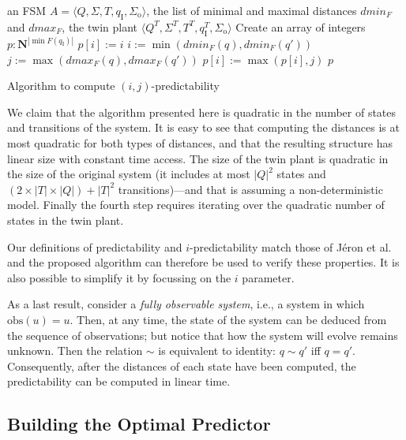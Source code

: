 \documentclass{article}
\newcommand{\naturals}{\mathbf{N}}
\newcommand{\qi}[0]{q_{\mathrm{I}}}
\newcommand{\sigmao}[0]{\Sigma_{\mathrm{o}}}
\newcommand{\obs}[0]{\mathrm{obs}}
\newcommand{\dmin}[1]{\mathit{dmin}_{#1}}
\newcommand{\dmax}[1]{\mathit{dmax}_{#1}}
\begin{document}
\begin{algorithm}
  \begin{algorithmic}[1]
     an FSM $A = \langle Q,\Sigma,T,\qi,\sigmao\rangle$, 
    the list of minimal and maximal distances $\dmin{F}$ and $\dmax{F}$, 
    the twin plant $\langle Q^T,\Sigma^T,T^T,\qi^T,\sigmao\rangle$
    \STATE Create an array of integers $p: \naturals^{|\min{F}(\qi)|}$
        \STATE $p[i] := i$
    \ENDFOR
    \STATE $i := \min (\dmin{F}(q),\dmin{F}(q'))$
    \STATE $j := \max (\dmax{F}(q),\dmax{F}(q'))$
      \STATE $p[i] := \max(p[i],j)$\label{line::ss->notpred}
    \ENDFOR
     $p$
  \end{algorithmic}
  \caption{Algorithm to compute $(i,j)$-predictability}
  \label{algo::pred}
\end{algorithm}

We claim that the algorithm presented here is quadratic 
in the number of states and transitions of the system.  
It is easy to see that computing the distances 
is at most quadratic for both types of distances, 
and that the resulting structure has linear size 
with constant time access.  
The size of the twin plant is quadratic 
in the size of the original system 
(it includes at most $|Q|^2$ states 
and $\left(2 \times |T| \times |Q|\right) + |T|^2$ transitions)---and that is assuming a non-deterministic model. 
Finally the fourth step 
requires iterating over the quadratic number of states in the twin plant.  

Our definitions of predictability and $i$-predictability 
match those of J\'eron et al. \cite{jeron-etal::wc::08} 
and the proposed algorithm can therefore be used 
to verify these properties.  
It is also possible to simplify it 
by focussing on the $i$ parameter.  

As a last result, consider a \emph{fully observable system}, 
i.e., a system in which $\obs(u) = u$.  
Then, at any time, the state of the system can be deduced 
from the sequence of observations; 
but notice that how the system will evolve 
remains unknown.  
Then the relation $\sim$ is equivalent to identity: 
$q \sim q'$ iff $q = q'$.  
Consequently, after the distances of each state have been computed, 
the predictability can be computed in linear time.  

\subsection{Building the Optimal Predictor}
\end{document}
